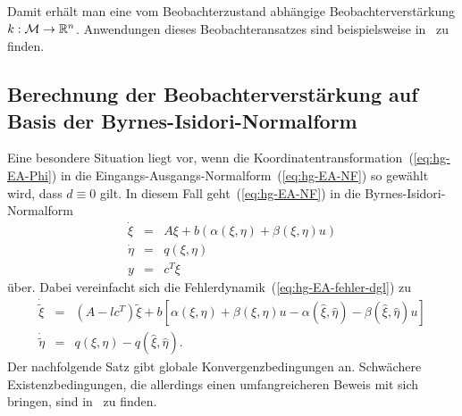 Damit erhält man eine vom Beobachterzustand abhängige Beobachterverstärkung
$k:\mathcal{M}\to{\mathbb{R}}^{n}$. Anwendungen dieses Beobachteransatzes sind
beispielsweise in~\cite{gao2010,mahmud2011,ide2013,koester2015}
zu finden.

\subsection{Berechnung der Beobachterverstärkung auf Basis der Byrnes-Isidori-Normalform}

Eine besondere Situation liegt vor, wenn die Koordinatentransformation~(\ref{eq:hg-EA-Phi})
in die Eingangs-Ausgangs-Normalform~(\ref{eq:hg-EA-NF}) so gewählt
wird, dass $d\equiv0$ gilt. In diesem Fall geht~(\ref{eq:hg-EA-NF})
in die Byrnes-Isidori-Normalform 
\begin{equation}
\begin{array}{rcl}
\dot{\xi} & = & A\xi+b(\alpha(\xi,\eta)+\beta(\xi,\eta)u)\\
\dot{\eta} & = & q(\xi,\eta)\\
y & = & c^{T}\xi
\end{array}\label{eq:hg-BI-NF}
\end{equation}
über. Dabei vereinfacht sich die Fehlerdynamik~(\ref{eq:hg-EA-fehler-dgl})
zu 
\begin{equation}
\begin{array}{lcl}
\dot{\tilde{\xi}} & = & \left(A-lc^{T}\right)\tilde{\xi}+b\left[\alpha(\xi,\eta)+\beta(\xi,\eta)u-\alpha(\hat{\xi},\hat{\eta})-\beta(\hat{\xi},\hat{\eta})u\right]\\
\dot{\tilde{\eta}} & = & q(\xi,\eta)-q(\hat{\xi},\hat{\eta}).
\end{array}\label{eq:hg-BI-NF-fehler-dgl}
\end{equation}
Der nachfolgende Satz gibt globale Konvergenzbedingungen an. Schwächere
Existenzbedingungen, die allerdings einen umfangreicheren Beweis mit
sich bringen, sind in~\cite{jo2000b} zu finden.

